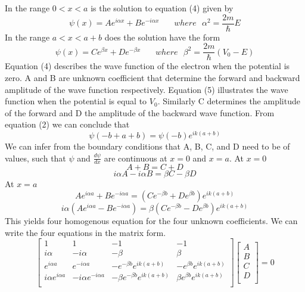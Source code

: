 \documentclass[12pt]{article}
\begin{document}
In the range $0<x<a$ is the solution to equation (4) given by
\begin{equation}
	\psi(x) = Ae^{i\alpha x} + Be^{-i\alpha x} \:\:\:\:\:\:\:\: where \:\:\: \alpha^2 = \frac{2m}{\hbar}E
\end{equation}
In the range $a<x<a+b$ does the solution have the form
\begin{equation}
	\psi(x) = Ce^{\beta x} + De^{-\beta x} \:\:\:\:\:\:\:\: where \:\:\: \beta^2 = \frac{2m}{\hbar}(V_0 - E)
\end{equation}
Equation (4) describes the wave function of the electron when the potential is zero. A and B are unknown coefficient that determine the forward and backward amplitude of the wave function respectively. Equation (5) illustrates the wave function when the potential is equal to $V_0$. Similarly C determines the amplitude of the forward and D the amplitude of the backward wave function. From equation (2) we can conclude that
\begin{equation}
	\psi(-b+a+b) = \psi(-b)e^{ik(a+b)}
\end{equation}
We can infer from the boundary conditions that A, B, C,  and D need to be of values, such that $\psi$ and $\frac{d\psi}{dx}$ are continuous at $x=0$ and $x=a$. At $x=0$
\begin{equation}
	A + B = C + D
\end{equation}
\begin{equation}
	i\alpha A - i\alpha B = \beta C - \beta D
\end{equation}
At $x=a$ 
\begin{equation}
	Ae^{i\alpha a} + Be^{-i\alpha a} = \left(Ce^{-\beta b} + De^{\beta b}\right)e^{ik(a+b)}
\end{equation}
\begin{equation}
	i\alpha \left(Ae^{i\alpha a}- Be^{-i\alpha a} \right) = \beta \left(Ce^{-\beta b} - De^{\beta b} \right)e^{ik(a+b)}
\end{equation}
This yields four homogenous equation for the four unknown coefficients. We can write the four equations in the matrix form.
\[
\begin{bmatrix}
	1 & 1 & -1 & -1 \\
	i\alpha & -i\alpha & -\beta & \beta \\
	e^{i\alpha a} & e^{-i\alpha a} & -e^{-\beta b}e^{ik(a+b)} & -e^{\beta b}e^{ik(a+b)} \\
	i\alpha e^{i\alpha a} & -i\alpha e^{-i\alpha a} & -\beta e^{-\beta b}e^{ik(a+b)} & \beta e^{\beta b}e^{ik(a+b)} \\
\end{bmatrix}
\begin{bmatrix}
	A\\
	B\\
	C\\
	D\\
\end{bmatrix}
=
0
\]
\end{document}

